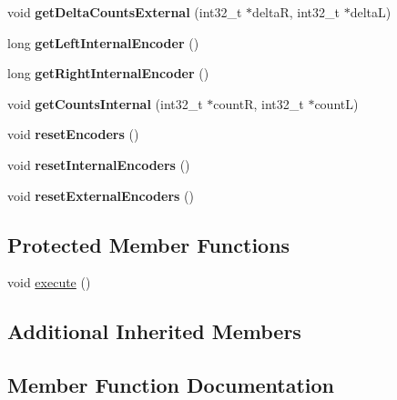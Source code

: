 \begin{DoxyCompactItemize}
\item 
\mbox{\label{classAsservEsialR_a085b1191c4b4676c90df1d7ad944f48e}} 
void {\bfseries get\+Delta\+Counts\+External} (int32\+\_\+t $\ast$deltaR, int32\+\_\+t $\ast$deltaL)
\item 
\mbox{\label{classAsservEsialR_a12c935ad6369c88f2bbd994a2abbfe16}} 
long {\bfseries get\+Left\+Internal\+Encoder} ()
\item 
\mbox{\label{classAsservEsialR_a522a00c00cccec44db953f195c463927}} 
long {\bfseries get\+Right\+Internal\+Encoder} ()
\item 
\mbox{\label{classAsservEsialR_aefeb4e45f67c44c3f5a896274ef9da17}} 
void {\bfseries get\+Counts\+Internal} (int32\+\_\+t $\ast$countR, int32\+\_\+t $\ast$countL)
\item 
\mbox{\label{classAsservEsialR_aa1b04c8fca6b1fe1d095ed2befdc3b11}} 
void {\bfseries reset\+Encoders} ()
\item 
\mbox{\label{classAsservEsialR_a098ae002a5455809bde43fd1616f10a3}} 
void {\bfseries reset\+Internal\+Encoders} ()
\item 
\mbox{\label{classAsservEsialR_afce022c3f43439d0d5488fed31a46cc4}} 
void {\bfseries reset\+External\+Encoders} ()
\end{DoxyCompactItemize}
\subsection*{Protected Member Functions}
\begin{DoxyCompactItemize}
\item 
void \hyperlink{classAsservEsialR_abfd3be9bde7bf8ae887688bf8bc0ca43}{execute} ()
\end{DoxyCompactItemize}
\subsection*{Additional Inherited Members}


\subsection{Member Function Documentation}
\mbox{\label{classAsservEsialR_abfd3be9bde7bf8ae887688bf8bc0ca43}} 
